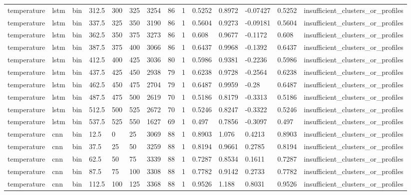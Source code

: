 \begin{table}[htbp]
\begin{tabular}{llllllllllllll}
temperature & lstm & bin & 312.5 & 300 & 325 & 3254 & 86 & 1 & 0.5252 & 0.8972 & -0.07427 & 0.5252 & insufficient\_clusters\_or\_profiles \\
temperature & lstm & bin & 337.5 & 325 & 350 & 3190 & 86 & 1 & 0.5604 & 0.9273 & -0.09181 & 0.5604 & insufficient\_clusters\_or\_profiles \\
temperature & lstm & bin & 362.5 & 350 & 375 & 3273 & 86 & 1 & 0.608 & 0.9677 & -0.1172 & 0.608 & insufficient\_clusters\_or\_profiles \\
temperature & lstm & bin & 387.5 & 375 & 400 & 3066 & 86 & 1 & 0.6437 & 0.9968 & -0.1392 & 0.6437 & insufficient\_clusters\_or\_profiles \\
temperature & lstm & bin & 412.5 & 400 & 425 & 3036 & 80 & 1 & 0.5986 & 0.9381 & -0.2236 & 0.5986 & insufficient\_clusters\_or\_profiles \\
temperature & lstm & bin & 437.5 & 425 & 450 & 2938 & 79 & 1 & 0.6238 & 0.9728 & -0.2564 & 0.6238 & insufficient\_clusters\_or\_profiles \\
temperature & lstm & bin & 462.5 & 450 & 475 & 2704 & 79 & 1 & 0.6487 & 0.9959 & -0.28 & 0.6487 & insufficient\_clusters\_or\_profiles \\
temperature & lstm & bin & 487.5 & 475 & 500 & 2619 & 70 & 1 & 0.5186 & 0.8179 & -0.3313 & 0.5186 & insufficient\_clusters\_or\_profiles \\
temperature & lstm & bin & 512.5 & 500 & 525 & 2672 & 70 & 1 & 0.5246 & 0.8247 & -0.3322 & 0.5246 & insufficient\_clusters\_or\_profiles \\
temperature & lstm & bin & 537.5 & 525 & 550 & 1627 & 69 & 1 & 0.497 & 0.7856 & -0.3097 & 0.497 & insufficient\_clusters\_or\_profiles \\
temperature & cnn & bin & 12.5 & 0 & 25 & 3069 & 88 & 1 & 0.8903 & 1.076 & 0.4213 & 0.8903 & insufficient\_clusters\_or\_profiles \\
temperature & cnn & bin & 37.5 & 25 & 50 & 3259 & 88 & 1 & 0.8194 & 0.9661 & 0.2785 & 0.8194 & insufficient\_clusters\_or\_profiles \\
temperature & cnn & bin & 62.5 & 50 & 75 & 3339 & 88 & 1 & 0.7287 & 0.8534 & 0.1611 & 0.7287 & insufficient\_clusters\_or\_profiles \\
temperature & cnn & bin & 87.5 & 75 & 100 & 3308 & 88 & 1 & 0.7782 & 0.9142 & 0.2733 & 0.7782 & insufficient\_clusters\_or\_profiles \\
temperature & cnn & bin & 112.5 & 100 & 125 & 3368 & 88 & 1 & 0.9526 & 1.188 & 0.8031 & 0.9526 & insufficient\_clusters\_or\_profiles \\

\end{tabular}
\end{table}
